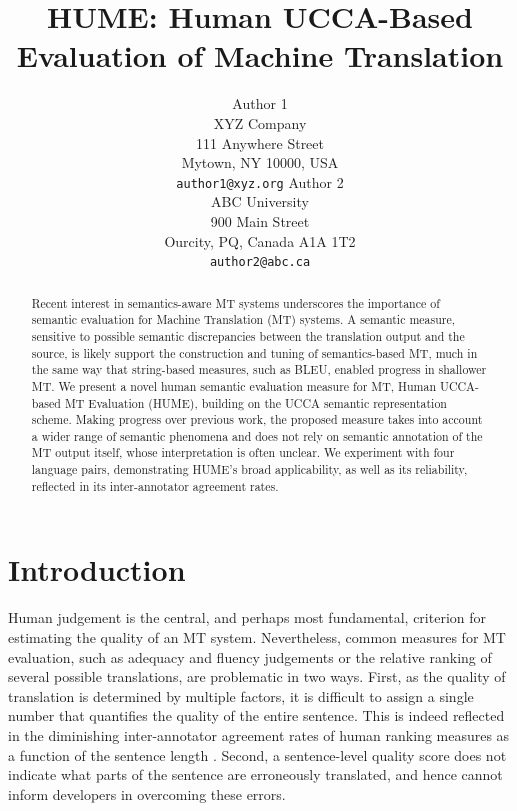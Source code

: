 \documentclass[11pt]{article}
\title{HUME: Human UCCA-Based Evaluation of Machine Translation}
\author{Author 1\\
	    XYZ Company\\
	    111 Anywhere Street\\
	    Mytown, NY 10000, USA\\
	    {\tt author1@xyz.org}
	  \And
	Author 2\\
  	ABC University\\
  	900 Main Street\\
  	Ourcity, PQ, Canada A1A 1T2\\
  {\tt author2@abc.ca}}
\date{}
\begin{document}
\maketitle

\begin{abstract}
  
  Recent interest in semantics-aware MT systems underscores the importance of
  semantic evaluation for Machine Translation (MT) systems. 
  A semantic measure, sensitive to possible semantic discrepancies
  between the translation output and the source, is likely support the construction
  and tuning of semantics-based MT, much in the same way that string-based measures,
  such as BLEU, enabled progress in shallower MT.
  We present a novel human semantic evaluation measure for MT, Human
  UCCA-based MT Evaluation (HUME), building on the UCCA semantic representation scheme.
  Making progress over previous work, the proposed measure takes into account
  a wider range of semantic phenomena and does not rely on semantic annotation
  of the MT output itself, whose interpretation is often unclear.
  We experiment with four language pairs, demonstrating HUME's broad applicability,
  as well as its reliability, reflected in its inter-annotator agreement rates.

\end{abstract}


\section{Introduction}\label{sec:intro}

Human judgement is the central, and perhaps most fundamental, criterion for
estimating the quality of an MT system.
Nevertheless, common measures for MT evaluation, such as adequacy and fluency judgements
or the relative ranking of several possible translations, are problematic in two ways.
First, as the quality of translation is determined by multiple factors, it is difficult
to assign a single number that quantifies the quality of the entire sentence. This
is indeed reflected in the diminishing inter-annotator agreement rates of human ranking measures
as a function of the sentence length \cite{Bojar:2011}.
Second, a sentence-level quality score does not indicate what parts of the sentence
are erroneously translated, and hence cannot inform developers in overcoming these errors.
\end{document}
